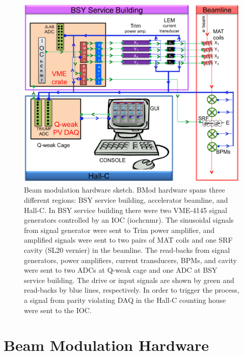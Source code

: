 \begin{singlespace}
\begin{figure}[!h]
	\begin{center}
	\includegraphics[width=15.0cm]{figures/BModHardwareSketch}
	\end{center}
	\caption
	{Beam modulation hardware sketch. BMod hardware spans three different regions: BSY service building, accelerator beamline, and Hall-C. In BSY service building there were two VME-4145 signal generators controlled by an IOC (iochcnmr). The sinusoidal signals from signal generator were sent to Trim power amplifier, and amplified signals were sent to two pairs of MAT coils and one SRF cavity (SL20 vernier) in the beamline. The read-backs from signal generators, power amplifiers, current transducers, BPMs, and cavity were sent to two ADCs at Q-weak cage and one ADC at BSY service building. The drive or input signals are shown by green and read-backs by blue lines, respectively. In order to trigger the process, a signal from parity violating DAQ in the Hall-C counting house were sent to the IOC.}
	\label{fig:BModHardwareSketch}
\end{figure}
\end{singlespace}

\section{Beam Modulation Hardware}
\label{Beam Modulation Hardware}

